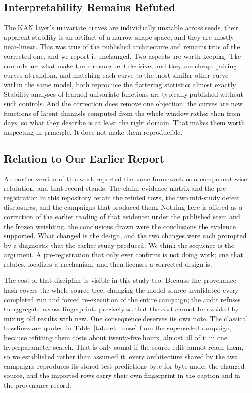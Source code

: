 \subsection{Interpretability Remains Refuted}
The KAN layer's univariate curves are individually unstable across seeds, their apparent stability is an artifact of a narrow shape space, and they are mostly near-linear. This was true of the published architecture and remains true of the corrected one, and we report it unchanged. Two aspects are worth keeping. The controls are what make the measurement decisive, and they are cheap: pairing curves at random, and matching each curve to the most similar other curve within the same model, both reproduce the flattering statistics almost exactly. Stability analyses of learned univariate functions are typically published without such controls. And the correction does remove one objection: the curves are now functions of latent channels computed from the whole window rather than from \robustFieldPublished{} days, so what they describe is at least the right domain. That makes them worth inspecting in principle. It does not make them reproducible.

\subsection{Relation to Our Earlier Report}
An earlier version of this work reported the same framework as a component-wise refutation, and that record stands. The claim--evidence matrix and the pre-registration in this repository retain the refuted rows, the two mid-study defect disclosures, and the campaigns that produced them. Nothing here is offered as a correction of the earlier reading of that evidence: under the published stem and the frozen weighting, the conclusions drawn were the conclusions the evidence supported. What changed is the design, and the two changes were each prompted by a diagnostic that the earlier study produced. We think the sequence is the argument. A pre-registration that only ever confirms is not doing work; one that refutes, localizes a mechanism, and then licenses a corrected design is.

The cost of that discipline is visible in this study too. Because the provenance hash covers the whole source tree, changing the model source invalidated every completed run and forced re-execution of the entire campaign; the audit refuses to aggregate across fingerprints precisely so that the cost cannot be avoided by mixing old results with new. One consequence deserves its own note. The classical baselines are quoted in Table~\ref{tab:cet_rmse} from the superseded campaign, because refitting them costs about twenty-five hours, almost all of it in one hyperparameter search. That is only sound if the source edit cannot reach them, so we established rather than assumed it: every architecture shared by the two campaigns reproduces its stored test predictions byte for byte under the changed source, and the imported rows carry their own fingerprint in the caption and in the provenance record.

